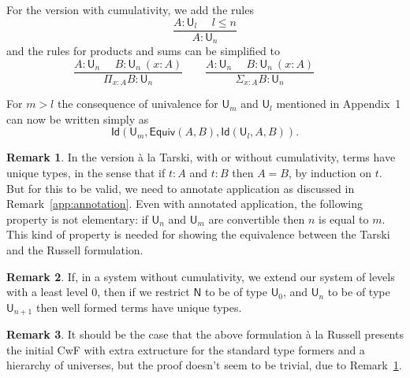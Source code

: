 \documentclass[11pt,a4paper]{article}
\theoremstyle{definition}
\newtheorem{remark}{Remark}
\newcommand{\eraser}[1]{}
\newcommand{\Id}{\mathsf{Id}}
\newcommand{\NN}{\mathsf{N}}
\newcommand{\UU}{\mathsf{U}}
\newcommand{\mypi}[3]{\Pi_{#1:#2}#3}
\newcommand{\mysig}[3]{\Sigma_{#1:#2}#3}
\newcommand{\Equiv}{\mathsf{Equiv}}
\begin{document}
For the version with cumulativity, we add the rules
$$
\frac{A:\UU_{l}~~~~~~l\leqslant n}{A:\UU_{n}}
$$
and the rules for products and sums can be simplified to
$$
\frac{A:\UU_{n}~~~~~~B:\UU_n~(x:A)}
     {\mypi{x}{A}{B}:\UU_{n}}~~~~~~~~~
\frac{A:\UU_{n}~~~~~~B:\UU_n~(x:A)}
     {\mysig{x}{A}{B}:\UU_{n}}~~~~~~~~~
$$

     For $m>l$ the consequence of univalence for $\UU_m$ and $\UU_l$
     mentioned in Appendix~1 can now be written
     simply as
     $$\Id(\UU_m,\Equiv(A,B),\Id(\UU_l,A,B)).$$



\begin{remark}\label{notelementary}
  In the version \`a la Tarski, with or without cumulativity, terms have unique types, in the sense that if $t : A$ and $t : B$ then $A = B$, by induction on $t$. But for this to be valid, we need to annotate application as discussed in Remark~\ref{app:annotation}.
  Even with annotated application, the following property is not elementary: if $\UU_n$ and $\UU_m$ are convertible then $n$ is equal to $m$. This kind of property is needed for showing the equivalence between the Tarski and the Russell formulation.
\end{remark}

\begin{remark} \label{uniqueness:without:cumulativity}
If, in a system without cumulativity, we extend our system of levels with a least level 0, then if we restrict $\NN$ to be of type $\UU_0$, and $\UU_n$ to be of type $\UU_{n+1}$ then well formed terms have unique types.
\end{remark}

\begin{remark}
  It should be the case that the above formulation \`a la Russell presents the initial CwF with extra extructure for the standard type formers and a hierarchy of universes, but the proof doesn't seem to be trivial, due to Remark~\ref{notelementary}.
\end{remark}

\eraser{PD: feedback from TYPES 2022. As expected, removing $U_0$ generated most feedback, people don't seem to have thought about this before. Pierre-Marie Pedrot asked about the proof-theoretic strength, but unfortunately I was not able to give a good answer on this immediately, although it is clear that it should be less than or equal to type theory with an external hierarchy with universes. I asked Anton whether it actually has the same strength, and he thought it should not be hard to prove that. I also talked to Mathieu who told me that Coq's checking of universe levels is with respect to a weaker theory than ours: only "less than" and "less than or equal" constraints between level experssions without "max", if I understood him correctly.}
\end{document}
